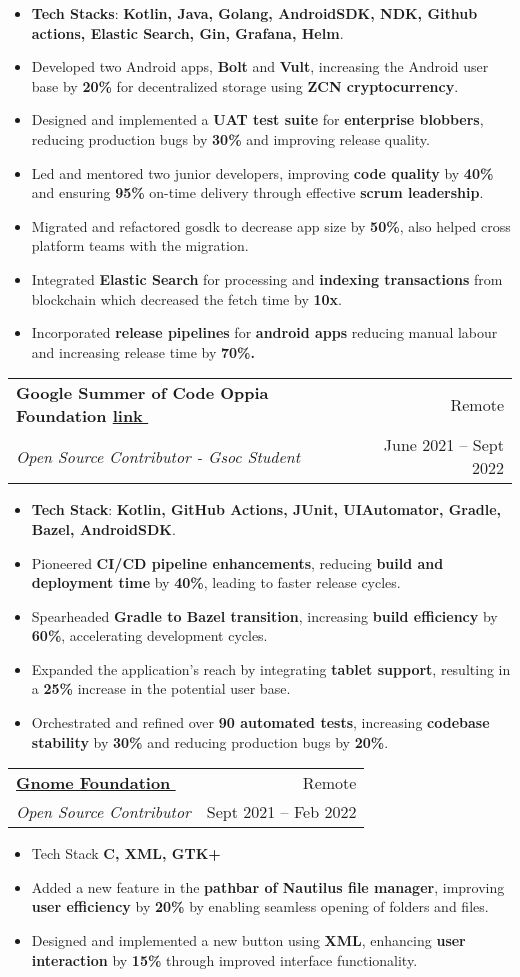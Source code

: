\documentclass[letterpaper,1pt]{article}
\makeatletter
\let\orighref\href
\renewcommand{\href}[2]{\orighref{#1}{#2\,\faExternalLink}}
\newcommand{\resumeItem}[1]{
  \item\small{
    #1 \vspace{-1.1pt}
  }
}
\newcommand{\resumeSubheading}[4]{
  \vspace{-2.75pt}\item
    \begin{tabular*}{0.97\textwidth}{l@{\extracolsep{\fill}}r}
      \textbf{#1} & #2 \\
      \textit{\small#3} & {\small #4} \\
    \end{tabular*}
}
\newcommand{\resumeItemListStart}{\begin{itemize}}
\newcommand{\resumeItemListEnd}{\end{itemize}\vspace{-7pt}}
\makeatother
\begin{document}
\resumeItemListStart
\resumeItem {\textbf{Tech Stacks}: \textbf{Kotlin, Java, Golang, AndroidSDK, NDK, Github actions, Elastic Search, Gin, Grafana, Helm}.}
\resumeItem {Developed two Android apps, \textbf{Bolt} and \textbf{Vult}, increasing the Android user base by \textbf{20\%} for decentralized storage using \textbf{ZCN cryptocurrency}.}
\resumeItem {Designed and implemented a \textbf{UAT test suite} for \textbf{enterprise blobbers}, reducing production bugs by \textbf{30\%} and improving release quality.}
\resumeItem {Led and mentored two junior developers, improving \textbf{code quality} by \textbf{40\%} and ensuring \textbf{95\%} on-time delivery through effective \textbf{scrum leadership}.}
\resumeItem{Migrated and refactored gosdk to decrease app size by \textbf{50\%}, also helped cross platform teams with the migration.  }
\resumeItem{Integrated \textbf{Elastic Search} for processing and \textbf{indexing transactions} from blockchain which decreased the fetch time by \textbf{10x}.}
\resumeItem{Incorporated \textbf{release pipelines} for \textbf{android apps} reducing manual labour and increasing release time by \textbf{70\%.}}
\resumeItemListEnd

\resumeSubheading
{Google Summer of Code Oppia Foundation \href{https://docs.google.com/document/d/150Yk14Cxmy8OAbSSwgP1aXDBLo1b8HtuIhmrRhzEWU4/edit}{link}}{Remote}
{Open Source Contributor - Gsoc Student}{June 2021 -- Sept 2022}
\resumeItemListStart
\resumeItem {\textbf{Tech Stack}: \textbf{Kotlin, GitHub Actions, JUnit, UIAutomator, Gradle, Bazel, AndroidSDK}.}
\resumeItem {Pioneered \textbf{CI/CD pipeline enhancements}, reducing \textbf{build and deployment time} by \textbf{40\%}, leading to faster release cycles.}
\resumeItem {Spearheaded \textbf{Gradle to Bazel transition}, increasing \textbf{build efficiency} by \textbf{60\%}, accelerating development cycles.}
\resumeItem {Expanded the application’s reach by integrating \textbf{tablet support}, resulting in a \textbf{25\%} increase in the potential user base.}
\resumeItem {Orchestrated and refined over \textbf{90 automated tests}, increasing \textbf{codebase stability} by \textbf{30\%} and reducing production bugs by \textbf{20\%}.}
\resumeItemListEnd

\resumeSubheading
{\href{https://gnome.org}{Gnome Foundation}}{Remote}
{Open Source Contributor}{Sept 2021 -- Feb 2022}
\resumeItemListStart
\resumeItem {Tech Stack \textbf{C, XML, GTK+}}
\resumeItem {Added a new feature in the \textbf{pathbar of Nautilus file manager}, improving \textbf{user efficiency} by \textbf{20\%} by enabling seamless opening of folders and files.}
\resumeItem {Designed and implemented a new button using \textbf{XML}, enhancing \textbf{user interaction} by \textbf{15\%} through improved interface functionality.}
\resumeItemListEnd
\end{document}
